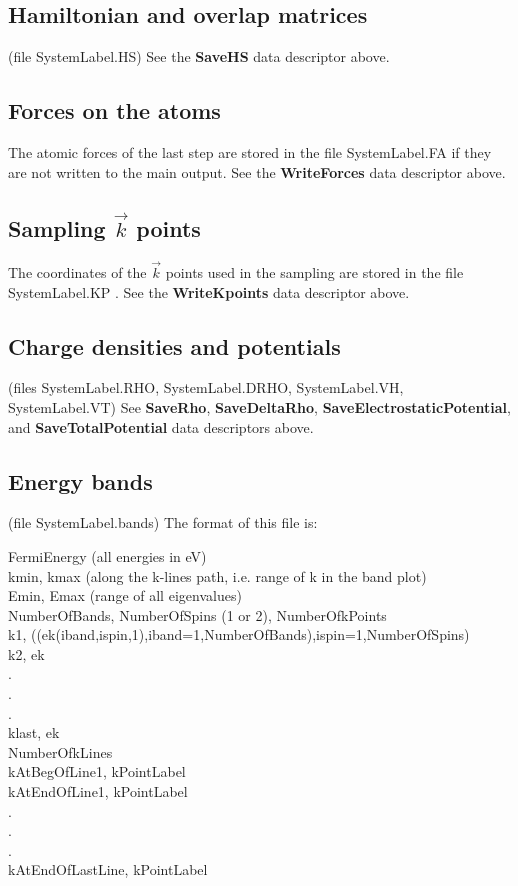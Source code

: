 \subsection{Hamiltonian and overlap matrices}
(file SystemLabel.HS) See the {\bf SaveHS} data descriptor above.


\subsection{Forces on the atoms}
The atomic forces of the last step are stored in the file
SystemLabel.FA if they are not written to the main output.
See the {\bf WriteForces} data descriptor above.


\subsection{Sampling $\vec k$ points}
The coordinates of the $\vec k$ points used in the sampling
are stored in the file SystemLabel.KP .
See the {\bf WriteKpoints} data descriptor above.


\subsection{Charge densities and potentials}
(files SystemLabel.RHO, SystemLabel.DRHO, SystemLabel.VH, SystemLabel.VT) 
See {\bf SaveRho}, {\bf SaveDeltaRho}, {\bf SaveElectrostaticPotential},
and {\bf SaveTotalPotential} data descriptors above.


\subsection{Energy bands}
(file SystemLabel.bands) The format of this file is:

\noindent
FermiEnergy (all energies in eV) \\
kmin, kmax (along the k-lines path, i.e. range of k in the band plot) \\
Emin, Emax (range of all eigenvalues) \\
NumberOfBands, NumberOfSpins (1 or 2), NumberOfkPoints \\
k1, ((ek(iband,ispin,1),iband=1,NumberOfBands),ispin=1,NumberOfSpins) \\
k2, ek \\
 . \\
 . \\
 . \\
klast, ek \\
NumberOfkLines \\
kAtBegOfLine1, kPointLabel \\
kAtEndOfLine1, kPointLabel \\
  . \\
  . \\
  . \\
kAtEndOfLastLine, kPointLabel \\

